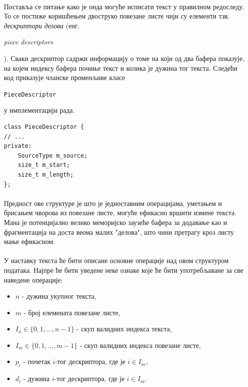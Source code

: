 \documentclass[12pt,oneside]{memoir}
\begin{document}
\paragraph{}
Поставља се питање како је онда могуће исписати текст у правилном редоследу. То се постиже
коришћењем двоструко повезане листе чији су елементи тзв. \emph{дескриптори делова} (енг. \begin{latinica}\textit{piece descriptors}\end{latinica}). Сваки дескриптор садржи
информацију о томе на који од два бафера показује, на којем индексу бафера почиње текст и
колика је дужина тог текста. Следећи код приказује чланске променљиве класе \begin{latinica}\verb|PieceDescriptor|\end{latinica} у имплементацији рада.

\begin{verbatim}
class PieceDescriptor {
// ...
private:
    SourceType m_source;
    size_t m_start;
    size_t m_length;
};
\end{verbatim}

\paragraph{}
Предност ове структуре је што је једноставним операцијама, уметањем и брисањем чворова из
повезане листе, могуће ефикасно вршити измене текста. Мана је потенцијално велико меморијско заузеће бафера за додавање као и фрагментација на доста веома малих "делова",
што чини претрагу кроз листу мање ефикасном.

\paragraph{}
У наставку текста ће бити описане основне операције над овом структуром података. Најпре
ће бити уведене неке ознаке које ће бити употребљаване за све наведене операције:

\begin{itemize}
	\item \(n\) - дужина укупног текста,
	\item \(m\) - број елемената повезане листе,
	\item \(I_n \in \{0, 1,...,n-1\}\) - скуп валидних индекса текста,
	\item \(I_m \in \{0, 1,...,m-1\}\) - скуп валидних индекса повезане листе,
	\item \(p_i\) - почетак \(i\)-тог дескриптора, где је \(i \in I_m\),
	\item \(d_i\) - дужина \(i\)-тог дескриптора, где је \(i \in I_m\).
\end{itemize}
\end{document}
